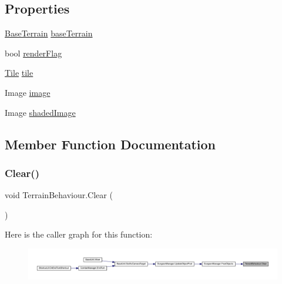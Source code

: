 \subsection*{Properties}
\begin{DoxyCompactItemize}
\item 
\mbox{\hyperlink{class_base_terrain}{Base\+Terrain}} \mbox{\hyperlink{class_terrain_behaviour_aeaebeaa90adc3c4b41853845a54a474e}{base\+Terrain}}
\item 
bool \mbox{\hyperlink{class_terrain_behaviour_ada11b3216887b92ca5f1de3e7165b4c2}{render\+Flag}}
\item 
\mbox{\hyperlink{class_tile}{Tile}} \mbox{\hyperlink{class_terrain_behaviour_a1c30fc3fee30bea9e90ee4acabcb5819}{tile}}
\item 
Image \mbox{\hyperlink{class_terrain_behaviour_a06f02f134baac6f02594037be9bf41d9}{image}}
\item 
Image \mbox{\hyperlink{class_terrain_behaviour_a91996bf69ee24b36099fa7a6b54aeaa5}{shaded\+Image}}
\end{DoxyCompactItemize}


\subsection{Member Function Documentation}
\mbox{\label{class_terrain_behaviour_a23ffdd00ac2a41293dff38496a09663d}} 
\subsubsection{\texorpdfstring{Clear()}{Clear()}}
{\footnotesize\ttfamily void Terrain\+Behaviour.\+Clear (\begin{DoxyParamCaption}{ }\end{DoxyParamCaption})}

Here is the caller graph for this function\+:\nopagebreak
\begin{figure}[H]
\begin{center}
\leavevmode
\includegraphics[width=350pt]{class_terrain_behaviour_a23ffdd00ac2a41293dff38496a09663d_icgraph}
\end{center}
\end{figure}
\mbox{\label{class_terrain_behaviour_a81acf1d578876b7a0870fdb0880c52a9}} 
